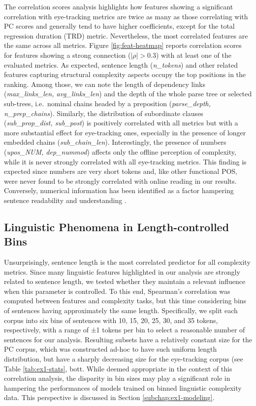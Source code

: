 \documentclass[a4paper, nobind]{templates/ociamthesis}
\begin{document}
The correlation scores analysis highlights how features showing a significant correlation with eye-tracking metrics are twice as many as those correlating with PC scores and generally tend to have higher coefficients, except for the total regression duration (TRD) metric. Nevertheless, the most correlated features are the same across all metrics. Figure \ref{fig:feat-heatmap} reports correlation scores for features showing a strong connection (\(|\rho|>0.3\)) with at least one of the evaluated metrics. As expected, sentence length (\emph{n\_tokens}) and other related features capturing structural complexity aspects occupy the top positions in the ranking. Among those, we can note the length of dependency links (\emph{max\_links\_len, avg\_links\_len}) and the depth of the whole parse tree or selected sub-trees, i.e.~nominal chains headed by a preposition (\emph{parse\_depth, n\_prep\_chains}).
Similarly, the distribution of subordinate clauses (\emph{sub\_prop\_dist, sub\_post}) is positively correlated with all metrics but with a more substantial effect for eye-tracking ones, especially in the presence of longer embedded chains (\emph{sub\_chain\_len}).
Interestingly, the presence of numbers (\emph{upos\_NUM, dep\_nummod}) affects only the offline perception of complexity, while it is never strongly correlated with all eye-tracking metrics. This finding is expected since numbers are very short tokens and, like other functional POS, were never found to be strongly correlated with online reading in our results. Conversely, numerical information has been identified as a factor hampering sentence readability and understanding \autocite{rello-etal-2013-one}.

\hypertarget{subsubchap:ex1-analysis-bins}{%
\subsection{Linguistic Phenomena in Length-controlled Bins}\label{subsubchap:ex1-analysis-bins}}

Unsurprisingly, sentence length is the most correlated predictor for all complexity metrics. Since many linguistic features highlighted in our analysis are strongly related to sentence length, we tested whether they maintain a relevant influence when this parameter is controlled. To this end, Spearman's correlation was computed between features and complexity tasks, but this time considering bins of sentences having approximately the same length. Specifically, we split each corpus into six bins of sentences with 10, 15, 20, 25, 30, and 35 tokens, respectively, with a range of ±1 tokens per bin to select a reasonable number of sentences for our analysis. Resulting subsets have a relatively constant size for the PC corpus, which was constructed ad-hoc to have such uniform length distribution, but have a sharply decreasing size for the eye-tracking corpus (see Table \ref{tab:ex1-stats}, bott. While deemed appropriate in the context of this correlation analysis, the disparity in bin sizes may play a significant role in hampering the performances of models trained on binned linguistic complexity data. This perspective is discussed in Section \ref{subchap:ex1-modeling}.
\end{document}
